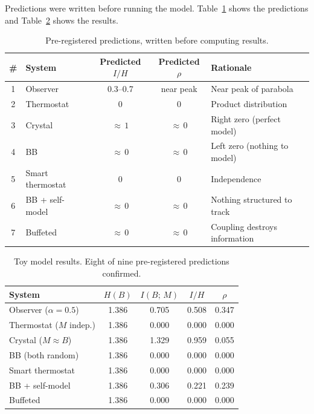 \documentclass[12pt]{article}
\theoremstyle{remark}
\begin{document}
Predictions were written before running the model. Table~\ref{tab:predictions} shows the predictions and Table~\ref{tab:results} shows the results.

\begin{table}[ht]
\centering
\begin{tabular}{clccl}
\toprule
\# & System & Predicted $I/H$ & Predicted $\rho$ & Rationale \\
\midrule
1 & Observer & 0.3--0.7 & near peak & Near peak of parabola \\
2 & Thermostat & 0 & 0 & Product distribution \\
3 & Crystal & ${\approx}\,1$ & ${\approx}\,0$ & Right zero (perfect model) \\
4 & BB & ${\approx}\,0$ & ${\approx}\,0$ & Left zero (nothing to model) \\
5 & Smart thermostat & 0 & 0 & Independence \\
6 & BB + self-model & ${\approx}\,0$ & ${\approx}\,0$ & Nothing structured to track \\
7 & Buffeted & ${\approx}\,0$ & ${\approx}\,0$ & Coupling destroys information \\
\bottomrule
\end{tabular}
\caption{Pre-registered predictions, written before computing results.}
\label{tab:predictions}
\end{table}

\begin{table}[ht]
\centering
\begin{tabular}{lcccc}
\toprule
System & $H(B)$ & $I(B;\,M)$ & $I/H$ & $\rho$ \\
\midrule
Observer ($\alpha = 0.5$) & 1.386 & 0.705 & 0.508 & 0.347 \\
Thermostat ($M$ indep.) & 1.386 & 0.000 & 0.000 & 0.000 \\
Crystal ($M \approx B$) & 1.386 & 1.329 & 0.959 & 0.055 \\
BB (both random) & 1.386 & 0.000 & 0.000 & 0.000 \\
Smart thermostat & 1.386 & 0.000 & 0.000 & 0.000 \\
BB + self-model & 1.386 & 0.306 & 0.221 & 0.239 \\
Buffeted & 1.386 & 0.000 & 0.000 & 0.000 \\
\bottomrule
\end{tabular}
\caption{Toy model results. Eight of nine pre-registered predictions confirmed.}
\label{tab:results}
\end{table}
\end{document}
